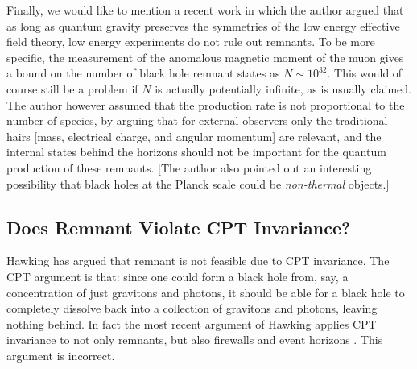 \documentclass[12pt]{article}
\newcommand{\2}{$^2$}
\newcommand{\3}{$^3$}
\newcommand{\4}{$_4$}
\newcommand{\5}{$_5$}
\begin{document}
Finally, we would like to mention a recent work \cite{xavier} in which the author argued that as long as quantum
gravity preserves the symmetries of the low energy effective field theory, low energy experiments do not rule out remnants. To be more specific, the measurement of the anomalous magnetic moment of the muon gives a bound on the number of black hole remnant states as $N\sim 10^{32}$. This would of course still be a problem if $N$ is actually potentially infinite, as is usually claimed. The author however assumed that the production rate is not proportional to the number of species, by arguing that for external observers only the traditional hairs [mass, electrical charge, and angular momentum] are relevant, and the internal states behind the horizons should not be important for the quantum production of these remnants. [The author also pointed out an interesting possibility that black holes at the Planck scale could be \emph{non-thermal} objects.]

\subsection{Does Remnant Violate CPT Invariance?}

Hawking has argued that remnant is not feasible due to CPT invariance. The CPT argument is that: since one could form a black hole from, say, a concentration of just gravitons and photons, it should be able for a black hole to completely dissolve back into a collection of gravitons and photons, leaving nothing behind. In fact the most recent argument of Hawking applies CPT invariance to not only remnants, but also firewalls and event horizons \cite{1401.5761}. This argument is incorrect. 
\end{document}
